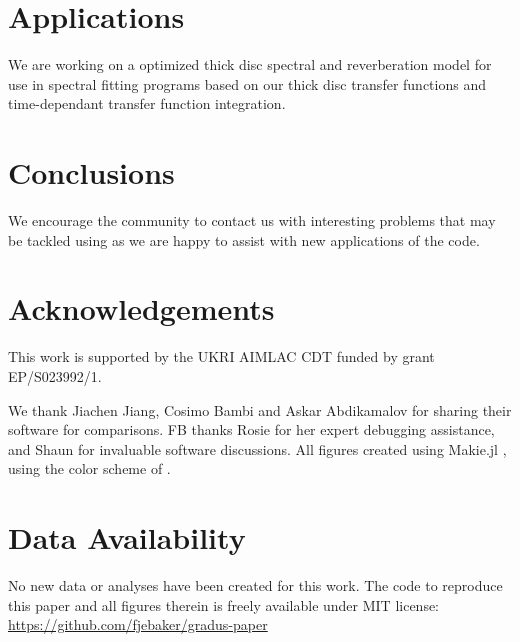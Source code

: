 \documentclass[fleqn,usenatbib]{mnras}
\begin{document}
\section{Applications}




We are working on a optimized thick disc spectral and reverberation model for use in spectral fitting programs based on our thick disc transfer functions and time-dependant transfer function integration. 

\section{Conclusions}

We encourage the community to contact us with interesting problems that may be tackled using \Gradus as we are happy to assist with new applications of the code.



\section*{Acknowledgements}
This work is supported by the UKRI AIMLAC CDT funded by grant EP/S023992/1.

We thank Jiachen Jiang, Cosimo Bambi and Askar Abdikamalov for sharing their software for comparisons. FB thanks Rosie for her expert debugging assistance, and Shaun for invaluable software discussions. All figures created using Makie.jl \citep{DanischKrumbiegel2021}, using the color scheme of \cite{wong_points_2011}.

\section*{Data Availability}

No new data or analyses have been created for this work. The code to reproduce this paper and all figures therein is freely available under MIT license:
\url{https://github.com/fjebaker/gradus-paper}
\end{document}
